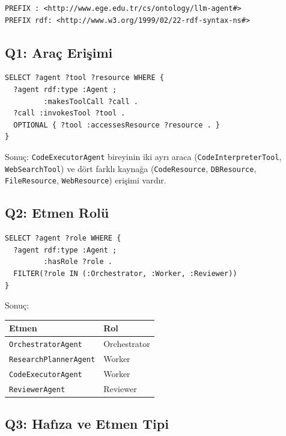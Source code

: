 \documentclass[10pt, a4paper, twocolumn]{article}
\begin{document}
\begin{lstlisting}[language=sparql]
PREFIX : <http://www.ege.edu.tr/cs/ontology/llm-agent#>
PREFIX rdf: <http://www.w3.org/1999/02/22-rdf-syntax-ns#>
\end{lstlisting}

\subsection*{Q1: Araç Erişimi}

\begin{lstlisting}[language=sparql]
SELECT ?agent ?tool ?resource WHERE {
  ?agent rdf:type :Agent ;
         :makesToolCall ?call .
  ?call :invokesTool ?tool .
  OPTIONAL { ?tool :accessesResource ?resource . }
}
\end{lstlisting}

\noindent Sonuç: \texttt{CodeExecutorAgent} bireyinin iki ayrı araca (\texttt{CodeInterpreterTool}, \texttt{WebSearchTool}) ve dört farklı kaynağa (\texttt{CodeResource}, \texttt{DBResource}, \texttt{FileResource}, \texttt{WebResource}) erişimi vardır.

\subsection*{Q2: Etmen Rolü}

\begin{lstlisting}[language=sparql]
SELECT ?agent ?role WHERE {
  ?agent rdf:type :Agent ;
         :hasRole ?role .
  FILTER(?role IN (:Orchestrator, :Worker, :Reviewer))
}
\end{lstlisting}

\noindent Sonuç:

\begin{center}
\scriptsize
\begin{tabular}{|p{2.8cm}|p{2cm}|}
\hline
\textbf{Etmen} & \textbf{Rol} \\
\hline
\texttt{OrchestratorAgent} & Orchestrator \\
\hline
\texttt{ResearchPlannerAgent} & Worker \\
\hline
\texttt{CodeExecutorAgent} & Worker \\
\hline
\texttt{ReviewerAgent} & Reviewer \\
\hline
\end{tabular}
\label{tab:q2-result}
\end{center}

\subsection*{Q3: Hafıza ve Etmen Tipi}
\end{document}
